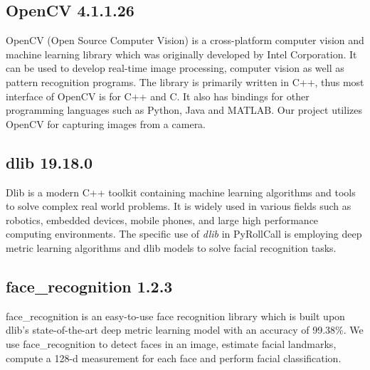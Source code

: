 
\subsection{OpenCV 4.1.1.26}
OpenCV (Open Source Computer Vision) is a cross-platform computer vision and machine learning library which was
originally developed by Intel Corporation. It can be used to develop real-time image processing, computer vision
as well as pattern recognition programs. The library is primarily written in C++, thus most interface of
OpenCV is for C++ and C. It also has bindings for other programming languages such as Python, Java and MATLAB.
Our project utilizes OpenCV for capturing images from a camera.

\subsection{dlib 19.18.0}
Dlib is a modern C++ toolkit containing machine learning algorithms and tools to solve complex real world problems.
It is widely used in various fields such as robotics, embedded devices, mobile phones, and large high performance
computing environments. The specific use of \emph{dlib} in PyRollCall is employing deep metric learning algorithms
and dlib models to solve facial recognition tasks.

\subsection{face\_recognition 1.2.3}
face\_recognition is an easy-to-use face recognition library which is built upon dlib's state-of-the-art
deep metric learning model with an accuracy of 99.38\%. We use face\_recognition to detect faces in an image,
estimate facial landmarks, compute a 128-d measurement for each face and perform facial classification.

